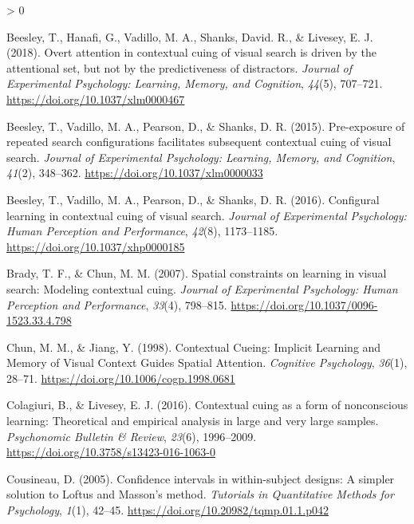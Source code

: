 \documentclass[
  english,
  man,floatsintext]{apa7}
\newlength{\cslhangindent}
\newenvironment{CSLReferences}[2] %
 {%
  \setlength{\parindent}{0pt}
  \ifodd #1 \everypar{\setlength{\hangindent}{\cslhangindent}}\ignorespaces\fi
  \ifnum #2 > 0
  \setlength{\parskip}{#2\baselineskip}
  \fi
 }%
 {}
\begin{document}
\hypertarget{refs}{}
\begin{CSLReferences}{1}{0}
\leavevmode\hypertarget{ref-beesley2018}{}%
Beesley, T., Hanafi, G., Vadillo, M. A., Shanks, David. R., \& Livesey, E. J. (2018). Overt attention in contextual cuing of visual search is driven by the attentional set, but not by the predictiveness of distractors. \emph{Journal of Experimental Psychology: Learning, Memory, and Cognition}, \emph{44}(5), 707--721. \url{https://doi.org/10.1037/xlm0000467}

\leavevmode\hypertarget{ref-beesley2015b}{}%
Beesley, T., Vadillo, M. A., Pearson, D., \& Shanks, D. R. (2015). Pre-exposure of repeated search configurations facilitates subsequent contextual cuing of visual search. \emph{Journal of Experimental Psychology: Learning, Memory, and Cognition}, \emph{41}(2), 348--362. \url{https://doi.org/10.1037/xlm0000033}

\leavevmode\hypertarget{ref-beesley2016}{}%
Beesley, T., Vadillo, M. A., Pearson, D., \& Shanks, D. R. (2016). Configural learning in contextual cuing of visual search. \emph{Journal of Experimental Psychology: Human Perception and Performance}, \emph{42}(8), 1173--1185. \url{https://doi.org/10.1037/xhp0000185}

\leavevmode\hypertarget{ref-brady2007}{}%
Brady, T. F., \& Chun, M. M. (2007). Spatial constraints on learning in visual search: {Modeling} contextual cuing. \emph{Journal of Experimental Psychology: Human Perception and Performance}, \emph{33}(4), 798--815. \url{https://doi.org/10.1037/0096-1523.33.4.798}

\leavevmode\hypertarget{ref-chun1998}{}%
Chun, M. M., \& Jiang, Y. (1998). Contextual {Cueing}: {Implicit Learning} and {Memory} of {Visual Context Guides Spatial Attention}. \emph{Cognitive Psychology}, \emph{36}(1), 28--71. \url{https://doi.org/10.1006/cogp.1998.0681}

\leavevmode\hypertarget{ref-colagiuri2016}{}%
Colagiuri, B., \& Livesey, E. J. (2016). Contextual cuing as a form of nonconscious learning: {Theoretical} and empirical analysis in large and very large samples. \emph{Psychonomic Bulletin \& Review}, \emph{23}(6), 1996--2009. \url{https://doi.org/10.3758/s13423-016-1063-0}

\leavevmode\hypertarget{ref-cousineau2005}{}%
Cousineau, D. (2005). Confidence intervals in within-subject designs: {A} simpler solution to {Loftus} and {Masson}'s method. \emph{Tutorials in Quantitative Methods for Psychology}, \emph{1}(1), 42--45. \url{https://doi.org/10.20982/tqmp.01.1.p042}


\end{CSLReferences}
\end{document}
